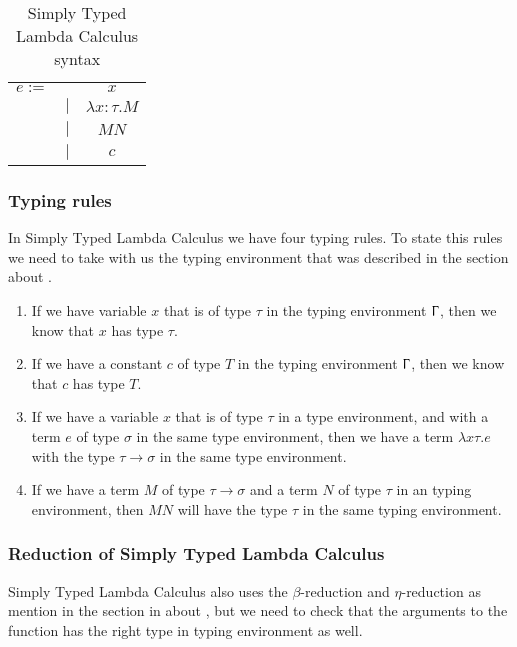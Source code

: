 \begin{table}[]
    \centering
    \begin{tabular}{c c c}
         $e :=$&  & $x$\\
         & $|$ & $\lambda x:\tau.M$ \\
         & $|$ &  $M N$ \\
         & $|$ &  $c$ \\
    \end{tabular}
    \caption{Simply Typed Lambda Calculus syntax}
    \label{tab:STLC syntax}
\end{table}

\subsubsection{Typing rules}
In Simply Typed Lambda Calculus we have four typing rules. To state this rules we need to take with us the typing environment that was described in the section about .

\begin{enumerate}
    \item If we have variable $x$ that is of type $\tau$ in the typing environment $\Upgamma$, then we know that $x$ has type $\tau$.
    \item If we have a constant $c$ of type $T$ in the typing environment $\Upgamma$, then we know that $c$ has type $T$.
    \item If we have a variable $x$ that is of type $\tau$ in a type environment, and with a term $e$ of type $\sigma$ in the same type environment, then we have a term $\lambda x\tau .e$ with the type $\tau \rightarrow \sigma$ in the same type environment.
    \item If we have a term $M$ of type $\tau \rightarrow \sigma$ and a term $N$ of type $\tau$ in an typing environment, then $M N$ will have the type $\tau$ in the same typing environment.
\end{enumerate}

\subsubsection{Reduction of Simply Typed Lambda Calculus}
Simply Typed Lambda Calculus also uses the $\beta$-reduction and $\eta$-reduction as mention in the 
section in about , but we need to check that the arguments to the function has 
the right type in typing environment as well. 

